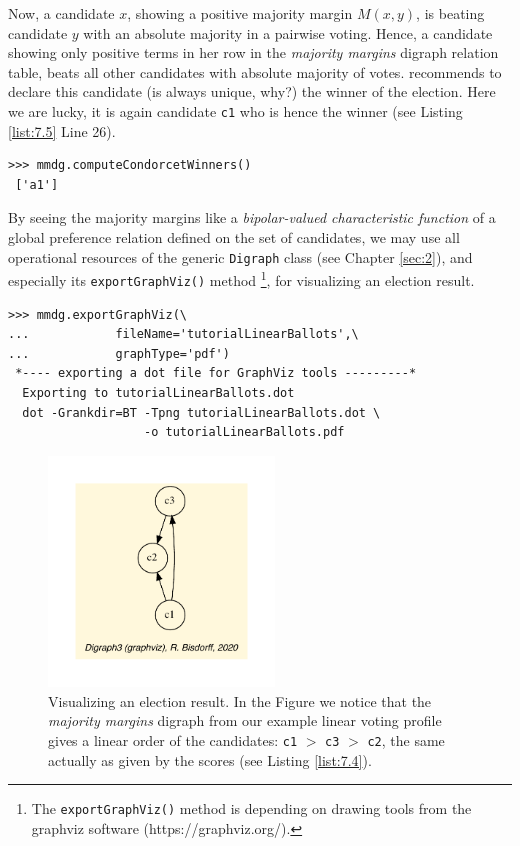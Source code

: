 Now, a candidate $x$, showing a positive majority margin $M(x,y)$, is beating candidate $y$  with an absolute majority in a pairwise voting. Hence, a candidate showing only positive terms in her row in the \emph{majority margins} digraph relation table, beats all other candidates with absolute majority of votes. \Condorcet recommends to declare this candidate (is always unique, why?) the winner of the election. Here we are lucky, it is again candidate \texttt{c1} who is hence the \Condorcet winner (see Listing \ref{list:7.5} Line 26).
\begin{lstlisting}
>>> mmdg.computeCondorcetWinners()
 ['a1']  
\end{lstlisting}    

By seeing the majority margins like a \emph{bipolar-valued characteristic function} of a global preference relation defined on the set of candidates, we may use all operational resources of the generic \texttt{Digraph} class (see Chapter \ref{sec:2}), and especially its \texttt{exportGraphViz()} method \footnote{The \texttt{exportGraphViz()} method is depending on drawing tools from the graphviz software (https://graphviz.org/).}, for visualizing an election result.
\begin{lstlisting}
>>> mmdg.exportGraphViz(\
...            fileName='tutorialLinearBallots',\
...            graphType='pdf')
 *---- exporting a dot file for GraphViz tools ---------*
  Exporting to tutorialLinearBallots.dot
  dot -Grankdir=BT -Tpng tutorialLinearBallots.dot \
                   -o tutorialLinearBallots.pdf
\end{lstlisting}
\begin{figure}[h]
\sidecaption[t]
\includegraphics[width=6cm]{Figures/tutorialLinearBallots.pdf}
\caption{Visualizing an election result. In the Figure we notice that the \emph{majority margins} digraph from our example linear voting profile gives a linear order of the candidates: \texttt{c1} $>$ \texttt{c3} $>$ \texttt{c2}, the same actually as given by the \Borda scores (see Listing \ref{list:7.4}).
}
\label{fig:7.1}       %
\end{figure}

